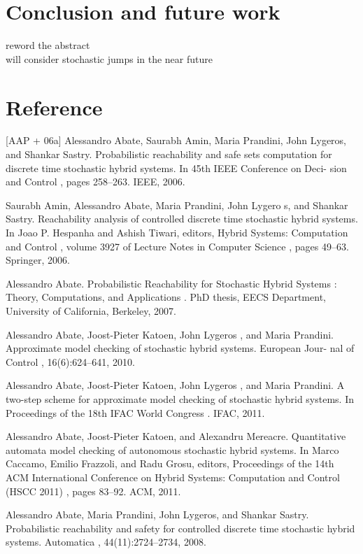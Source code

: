 \documentclass[runningheads,a4paper]{llncs}
\begin{document}
\section{Conclusion and future work}
reword the abstract\\
will consider stochastic jumps in the near future

\section*{Reference}

[AAP + 06a] Alessandro Abate, Saurabh Amin, Maria Prandini, John Lygeros, and Shankar Sastry. Probabilistic reachability and safe sets computation for discrete time stochastic hybrid systems. In 45th IEEE Conference on Deci- sion and Control , pages 258–263. IEEE, 2006.

\noindent[AAP + 06b] Saurabh Amin, Alessandro Abate, Maria Prandini, John Lygero s, and Shankar Sastry. Reachability analysis of controlled discrete time stochastic hybrid systems. In Joao P. Hespanha and Ashish Tiwari, editors, Hybrid Systems: Computation and Control , volume 3927 of Lecture Notes in Computer Science , pages 49–63. Springer, 2006.

\noindent[Aba07] Alessandro Abate. Probabilistic Reachability for Stochastic Hybrid Systems : Theory, Computations, and Applications . PhD thesis, EECS Department, University of California, Berkeley, 2007.

\noindent[AKLP10] Alessandro Abate, Joost-Pieter Katoen, John Lygeros , and Maria Prandini. Approximate model checking of stochastic hybrid systems. European Jour- nal of Control , 16(6):624–641, 2010. 

\noindent[AKLP11] Alessandro Abate, Joost-Pieter Katoen, John Lygeros , and Maria Prandini. A two-step scheme for approximate model checking of stochastic hybrid systems. In Proceedings of the 18th IFAC World Congress . IFAC, 2011.

\noindent[AKM11] Alessandro Abate, Joost-Pieter Katoen, and Alexandru Mereacre. Quantitative automata model checking of autonomous stochastic hybrid systems. In Marco Caccamo, Emilio Frazzoli, and Radu Grosu, editors, Proceedings of the 14th ACM International Conference on Hybrid Systems: Computation and Control (HSCC 2011) , pages 83–92. ACM, 2011.

\noindent[APLS08] Alessandro Abate, Maria Prandini, John Lygeros, and Shankar Sastry. Probabilistic reachability and safety for controlled discrete time stochastic hybrid systems. Automatica , 44(11):2724–2734, 2008.
\end{document}
